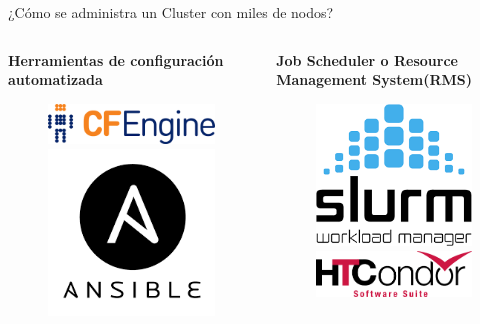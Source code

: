 \documentclass[11pt]{beamer}
\begin{document}
\begin{frame}{¿Cómo se administra un Cluster con miles de nodos?}

\begin{columns}
\begin{column}{0.5\textwidth}
  \textbf{Herramientas de configuración automatizada}
  
  \begin{figure}
  	\includegraphics[scale=0.3]{images/cfengine}
  	\includegraphics[scale=0.3]{images/ansible}
  \end{figure}
\end{column}
\begin{column}{0.5\textwidth}  %
  \textbf{Job Scheduler o Resource Management System(RMS)}
    \begin{figure}
  	\includegraphics[scale=0.3]{images/slurm}
  	\includegraphics[scale=0.3]{images/condor}
  \end{figure}
\end{column}
\end{columns}

\end{frame}
\end{document}
